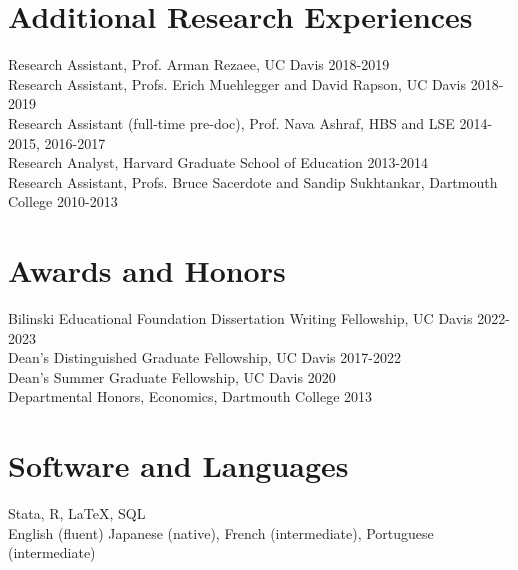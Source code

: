 \documentclass[10pt]{res} %
\begin{document}
\begin{resume}
		\section{Additional Research Experiences}
		Research Assistant, Prof. Arman Rezaee, UC Davis \hfill 2018-2019 \\
		Research Assistant, Profs. Erich Muehlegger and David Rapson, UC Davis \hfill 2018-2019 \\
		Research Assistant (full-time pre-doc), Prof. Nava Ashraf, HBS and LSE \hfill 2014-2015, 2016-2017 \\
		Research Analyst, Harvard Graduate School of Education  \hfill  2013-2014 \\
		Research Assistant, Profs. Bruce Sacerdote and Sandip Sukhtankar, Dartmouth College \hfill 2010-2013 \\
		\vspace{-\baselineskip} 
		\vspace{-\baselineskip} 
		\section{Awards and Honors} 
		Bilinski Educational Foundation Dissertation Writing Fellowship, UC Davis   \hfill 2022-2023  \\
		Dean's Distinguished Graduate Fellowship, UC Davis \hfill 2017-2022  \\
		Dean's Summer Graduate Fellowship, UC Davis \hfill 2020 \\
		Departmental Honors, Economics, Dartmouth College \hfill 2013 \\
		\vspace{-\baselineskip} 
		\vspace{-\baselineskip} 
		\section{Software and Languages}
		Stata, R, \LaTeX, SQL \\
		English (fluent) Japanese (native), French (intermediate), Portuguese (intermediate)
		


\end{resume}
\end{document}
